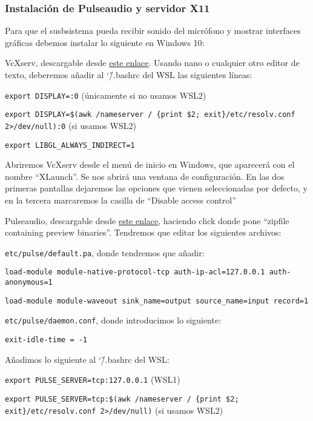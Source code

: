 \subsubsection{Instalación de Pulseaudio y servidor X11}
Para que el susbsistema pueda recibir sonido del micrófono y mostrar interfaces gráficas debemos instalar lo siguiente en Windows 10:

VcXserv, descargable desde \href{https://sourceforge.net/projects/vcxsrv/}{este enlace}. Usando nano o cualquier otro editor de texto, deberemos añadir al \char`\~/.bashrc del WSL las siguientes líneas:

\texttt{export DISPLAY=:0} (únicamente si no usamos WSL2)

\texttt{export DISPLAY=\$(awk \textquotesingle/nameserver / \{print \$2; exit\}\textquotesingle \newline/etc/resolv.conf 2>/dev/null):0} (si usamos WSL2)

\texttt{export LIBGL\_ALWAYS\_INDIRECT=1}

Abriremos VcXserv desde el menú de inicio en Windows, que aparecerá con el nombre ``XLaunch''. Se nos abrirá una ventana de configuración. En las dos primeras pantallas dejaremos las opciones que vienen seleccionadas por defecto, y en la tercera marcaremos la casilla de ``Disable access control''

Pulseaudio, descargable desde \href{https://www.freedesktop.org/wiki/Software/PulseAudio/Ports/Windows/Support/}{este enlace}, haciendo click donde pone ``zipfile containing preview binaries''. Tendremos que editar los siguientes archivos:

\texttt{etc/pulse/default.pa}, donde tendremos que añadir:

\texttt{load-module module-native-protocol-tcp auth-ip-acl=127.0.0.1 auth-anonymous=1}

\texttt{load-module module-waveout sink\_name=output source\_name=input record=1}

\texttt{etc/pulse/daemon.conf}, donde introducimos lo siguiente:

\texttt{exit-idle-time = -1}

Añadimos lo siguiente  al \char`\~/.bashrc del WSL:

\texttt{export PULSE\_SERVER=tcp:127.0.0.1} (WSL1)

\texttt{export PULSE\_SERVER=tcp:\$(awk \textquotesingle/nameserver / \{print \$2; exit\}\textquotesingle \newline/etc/resolv.conf 2>/dev/null)} (si usamos WSL2)

